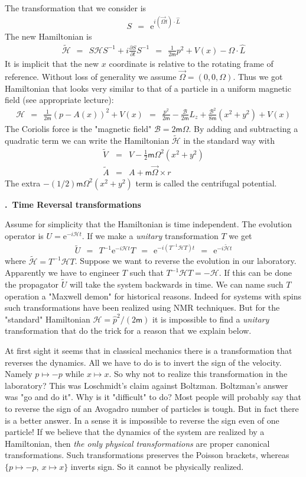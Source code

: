 \documentclass[onecolumn,fleqn, 11pt]{revtex4}
\newcommand{\eexp}{\mathrm{e}^}
\newcommand{\mass}{\mathsf{m}}
\newcommand{\beq}{\begin{eqnarray}}
\newcommand{\eeq}{\end{eqnarray}}
\renewcommand{\thesubsection}{\arabic{subsection}}
\renewcommand{\thesubsubsection}{\arabic{subsubsection}}
\newcommand{\sheadC}[1]
{
\addtocounter{subsubsection}{1}
\vspace{5mm}
{\bf \thesubsection.\thesubsubsection \ #1}  
\nopagebreak
\phantomsection
}
\begin{document}
The transformation that we consider is 
\beq 
S \ \ = \ \ \eexp{i(\vec{\Omega} t) \cdot \hat{L}}
\eeq
The new Hamiltonian is 
\beq 
\tilde{\mathcal{H}}
\ \ = \ \ S\mathcal{H}S^{-1}+i\frac{\partial S}{\partial t}S^{-1}
\ \ = \ \ \frac{1}{2\mass}p^2 + V(x) - \Omega \cdot \hat{L} 
\eeq
It is implicit that the new $x$ coordinate 
is relative to the rotating frame of reference. 
Without loss of generality we assume $\vec{\Omega}=(0,0,\Omega)$.
Thus we got Hamiltonian that looks very similar to that 
of a particle in a uniform magnetic field (see appropriate lecture): 
\beq
\mathcal{H} 
\ \ = \ \ 
\frac{1}{2\mass}(p-A(x))^{2} + V(x) 
\ \ = \ \ 
\frac{p^2}{2\mass} - \frac{\mathcal{B}}{2\mass} L_{z}
+\frac{\mathcal{B}^2}{8\mass}(x^2+y^2) + V(x)
\eeq
The Coriolis force is the 
"magnetic field" $\mathcal{B} = 2\mass\Omega$. 
By adding and subtracting a quadratic term we can 
write the Hamiltonian $\tilde{\mathcal{H}}$ 
in the standard way with 
\beq
\tilde{V} &=& V - \frac{1}{2}\mass \Omega^2 (x^2+y^2) 
\\ \nonumber
\tilde{A} &=& A + \mass \vec{\Omega} \times r  
\eeq
The extra $-(1/2)\mass\Omega^2(x^2+y^2)$ term 
is called the centrifugal potential.





\sheadC{Time Reversal transformations} 
 
 
Assume for simplicity that the Hamiltonian is time independent. 
The evolution operator is $U=\eexp{-i\mathcal{H}t}$. 
If we make a {\em unitary} transformation $T$ we get  
\beq
\tilde{U} 
\ \ = \ \ T^{-1} \eexp{-i\mathcal{H}t} T 
\ \  = \ \ \eexp{-i (T^{-1} \mathcal{H} T) t} 
\ \ = \ \ \eexp{-i\tilde{\mathcal{H}}t}
\eeq
where $\tilde{\mathcal{H}} = T^{-1} \mathcal{H} T$. 
Suppose we want to reverse the evolution in our laboratory. 
Apparently we have to engineer $T$ such that $T^{-1} \mathcal{H} T = -\mathcal{H}$.
If this can be done the propagator $\tilde{U}$ will take 
the system backwards in time. We can name such $T$ operation 
a "Maxwell demon" for historical reasons. Indeed for systems 
with spins such transformations have been realized using NMR techniques. 
But for the "standard" Hamiltonian $\mathcal{H}=\hat{p}^{2}/(2\mass)$ 
it is impossible to find a {\em unitary} transformation that do the trick 
for a reason that we explain below.


At first sight it seems that in classical mechanics there is a transformation 
that reverses the dynamics. All we have to do is to invert 
the sign of the velocity. Namely $p \mapsto -p$ while $x\mapsto x$. 
So why not to realize this transformation in the laboratory? 
This was Loschmidt's claim against Boltzman. 
Boltzman's answer was "go and do it". 
Why is it "difficult" to do? 
Most people will probably say that to reverse the sign 
of an Avogadro number of particles is tough. 
But in fact there is a better answer. 
In a sense it is impossible to reverse the sign 
even of one particle! If we believe that the dynamics 
of the system are realized by a Hamiltonian, 
then {\em the only physical transformations} 
are proper canonical transformations.
Such transformations preserves the Poisson brackets, 
whereas ${\{ p \mapsto -p, \ x\mapsto x\}}$ inverts sign.
So it cannot be physically realized.  
  
\end{document}
